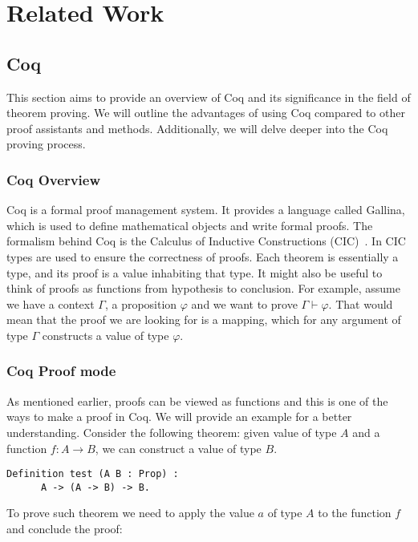 \section{Related Work}

\subsection{Coq}
This section aims to provide an overview of Coq and its significance in the field of theorem proving. We will outline the advantages of using Coq compared to other proof assistants and methods. Additionally, we will delve deeper into the Coq proving process.

\subsubsection{Coq Overview}
Coq is a formal proof management system. It provides a language called Gallina, which is used to define mathematical objects and write formal proofs. The formalism behind Coq is the Calculus of Inductive Constructions (CIC)~\cite{paulinmohring:hal-01094195}. In CIC types are used to ensure the correctness of proofs. Each theorem is essentially a type, and its proof is a value inhabiting that type. It might also be useful to think of proofs as functions from hypothesis to conclusion. For example, assume we have a context $\Gamma$, a proposition $\varphi$ and we want to prove $\Gamma \vdash \varphi$. That would mean that the proof we are looking for is a mapping, which for any argument of type $\Gamma$ constructs a value of type $\varphi$. 

\subsubsection{Coq Proof mode}
As mentioned earlier, proofs can be viewed as functions and this is one of the ways to make a proof in Coq. We will provide an example for a better understanding. Consider the following theorem: given value of type $A$ and a function $f : A \to B$, we can construct a value of type $B$. 

\vspace{0.5cm}
\begin{lstlisting}[language=coq]
    Definition test (A B : Prop) :
      A -> (A -> B) -> B.
\end{lstlisting}

To prove such theorem we need to apply the value $a$ of type $A$ to the function $f$ and conclude the proof:

